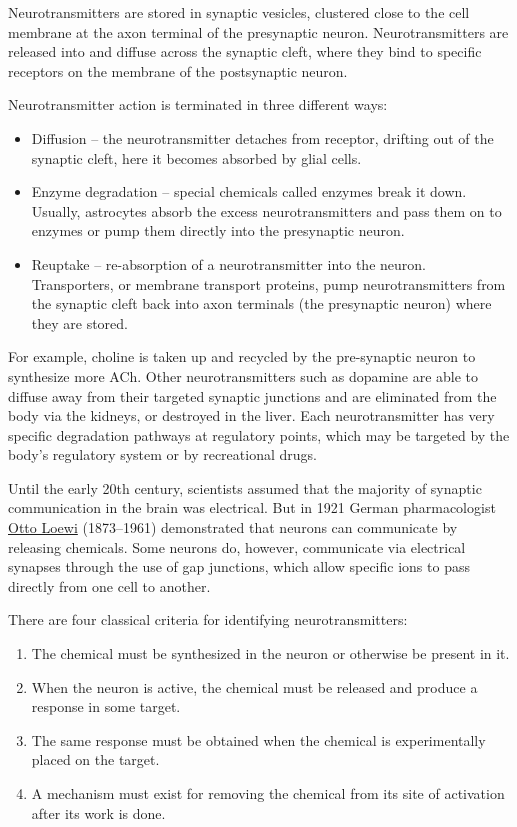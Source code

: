 Neurotransmitters are stored in synaptic vesicles, clustered close to the cell membrane at the axon terminal of the presynaptic neuron. Neurotransmitters are released into and diffuse across the synaptic cleft, where they bind to specific receptors on the membrane of the postsynaptic neuron.

Neurotransmitter action is terminated in three different ways:

\begin{itemize}
\tightlist
\item
  Diffusion -- the neurotransmitter detaches from receptor, drifting out of the synaptic cleft, here it becomes absorbed by glial cells.
\item
  Enzyme degradation -- special chemicals called enzymes break it down. Usually, astrocytes absorb the excess neurotransmitters and pass them on to enzymes or pump them directly into the presynaptic neuron.
\item
  Reuptake -- re-absorption of a neurotransmitter into the neuron. Transporters, or membrane transport proteins, pump neurotransmitters from the synaptic cleft back into axon terminals (the presynaptic neuron) where they are stored.
\end{itemize}

For example, choline is taken up and recycled by the pre-synaptic neuron to synthesize more ACh. Other neurotransmitters such as dopamine are able to diffuse away from their targeted synaptic junctions and are eliminated from the body via the kidneys, or destroyed in the liver. Each neurotransmitter has very specific degradation pathways at regulatory points, which may be targeted by the body's regulatory system or by recreational drugs.

Until the early 20th century, scientists assumed that the majority of synaptic communication in the brain was electrical. But in 1921 German pharmacologist \href{https://en.wikipedia.org/wiki/Otto_Loewi}{Otto Loewi} (1873--1961) demonstrated that neurons can communicate by releasing chemicals. Some neurons do, however, communicate via electrical synapses through the use of gap junctions, which allow specific ions to pass directly from one cell to another.

There are four classical criteria for identifying neurotransmitters:

\begin{enumerate}
\def\labelenumi{\arabic{enumi}.}
\tightlist
\item
  The chemical must be synthesized in the neuron or otherwise be present in it.
\item
  When the neuron is active, the chemical must be released and produce a response in some target.
\item
  The same response must be obtained when the chemical is experimentally placed on the target.
\item
  A mechanism must exist for removing the chemical from its site of activation after its work is done.
\end{enumerate}

